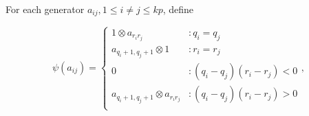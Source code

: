\documentclass[11pt]{amsart}
\def\ltblue{blue!20!white}
\def\C{{\mathbb C}}
\def\A{{\mathcal A}}
\theoremstyle{definition}
\begin{document}









For each generator $a_{ij}, 1\le i\ne j\le kp$, define

\begin{equation}
\psi(a_{ij}) =
  \begin{cases}
         1\otimes a_{r_ir_j} & \colon q_i = q_j\\
         a_{q_i+1,q_j+1}\otimes 1 & \colon r_i = r_j\\
         0 & \colon (q_i-q_j)(r_i-r_j)<0\\
         a_{q_i+1,q_j+1}\otimes a_{r_ir_j} & \colon (q_i-q_j)(r_i-r_j)>0\\
  \end{cases},
  \label{defn:psi}
\end{equation}
\end{document}
